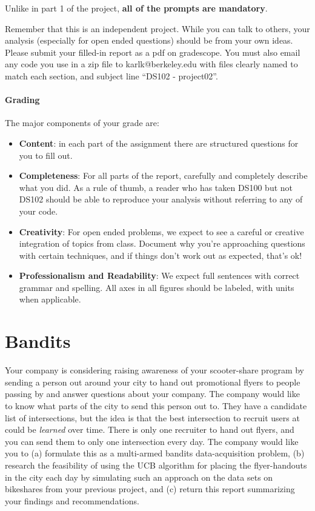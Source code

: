 \documentclass[12pt, answers, addpoints]{exam}
\begin{document}
Unlike in part 1 of the project, \textbf{all of the prompts are mandatory}.

Remember that this is an independent project. While you can talk to others, your analysis (especially for open ended questions) should be from your own ideas. Please submit your filled-in report as a pdf on gradescope. You must also email any code you use in a zip file to karlk@berkeley.edu with files clearly named to match each section, and subject line ``DS102 - project02''. 

\paragraph{Grading}
The major components of your grade are:
\begin{itemize}
\item \textbf{Content}: in each part of the assignment there are structured questions for you to fill out.
\item \textbf{Completeness}: For all parts of the report, carefully and completely describe what you did. As a rule of thumb, a reader who has taken DS100 but not DS102 should be able to reproduce your analysis without referring to any of your code. 
\item \textbf{Creativity}: For open ended problems, we expect to see a careful or creative integration of topics from class. Document why you're approaching questions with certain techniques, and if things don't work out as expected, that's ok!
\item \textbf{Professionalism and Readability}: We expect full sentences with correct grammar and spelling. All axes in all figures should be labeled, with units when applicable. 
\end{itemize}



\clearpage

\section{Bandits}
Your company is considering raising awareness of your scooter-share program by sending a person out around your city to hand out promotional flyers to people passing by and answer questions about your company. The company would like to know what parts of the city to send this person out to. They have a candidate list of intersections, but the idea is that the best intersection to recruit users at could be \emph{learned} over time. There is only one recruiter to hand out flyers, and you can send them to only one intersection every day. The company would like you to (a) formulate this as a multi-armed bandits data-acquisition problem, (b) research the feasibility of using the UCB algorithm for placing the flyer-handouts in the city each day by simulating such an approach on the data sets on bikeshares from your previous project, and (c) return this report summarizing your findings and recommendations.
\end{document}
